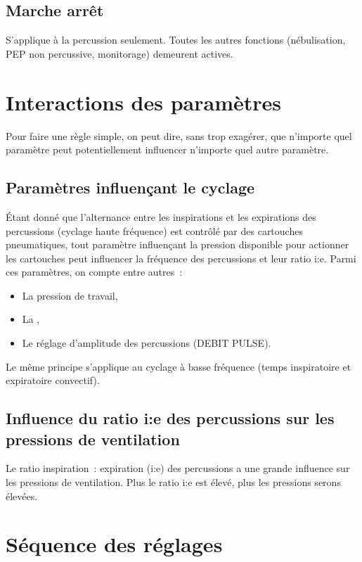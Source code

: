 \subsection{Marche arrêt}

S’applique à la percussion seulement. Toutes les autres fonctions
(nébulisation, PEP non percussive, monitorage) demeurent actives.

\section{Interactions des paramètres}

Pour faire une règle simple, on peut dire, sans trop exagérer, que n’importe
quel paramètre peut potentiellement influencer n’importe quel autre paramètre. 

\subsection{Paramètres influençant le cyclage}

Étant donné que l’alternance entre les inspirations et les expirations des
percussions (cyclage haute fréquence)  est contrôlé par des cartouches
pneumatiques, tout paramètre influençant la pression disponible pour actionner
les cartouches peut influencer la fréquence des percussions et leur ratio i:e.
Parmi ces paramètres, on compte entre autres :

\begin{itemize}
\item La pression de travail, 
\item La \fio, 
\item Le réglage d’amplitude des percussions (DEBIT PULSE).
\end{itemize}

Le même principe s’applique au cyclage à basse fréquence (temps inspiratoire et
expiratoire convectif).

\subsection{Influence du ratio i:e des percussions sur les pressions de ventilation}

Le ratio inspiration : expiration (i:e) des percussions a une grande influence
sur les pressions de ventilation. Plus le ratio i:e est élevé, plus les
pressions serons élevées.

\section{Séquence des réglages}

